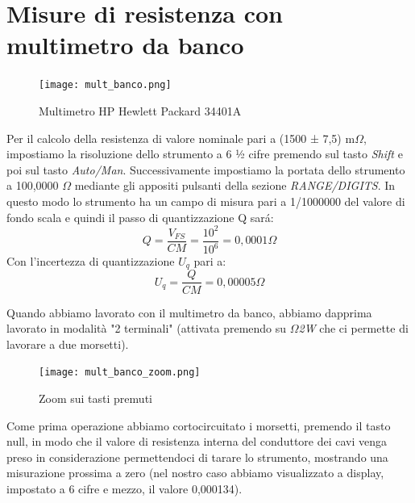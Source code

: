 \section{Misure di resistenza con multimetro da banco}
\label{sec:mult}


\begin{figure}[h]
    \centering
    \texttt{[image: mult\_banco.png]}
    \caption{Multimetro HP Hewlett Packard 34401A}
    \label{fig:mult_banco}
\end{figure}
\FloatBarrier

Per il calcolo della resistenza di valore nominale pari a (1500 ± 7,5) m$\Omega$, impostiamo la risoluzione dello strumento a 6 ½ cifre premendo sul tasto \emph{Shift} e poi sul tasto \emph{Auto/Man}. Successivamente impostiamo la portata dello strumento a 100,0000 $\Omega$ mediante gli appositi pulsanti della sezione \emph{RANGE/DIGITS}. In questo modo lo strumento ha un campo di misura 
pari a 1/1000000 del valore di fondo scala e quindi il passo di quantizzazione Q sar\'a: 
\begin{equation}
    Q = \frac{V_{FS}}{CM} = \frac{10^2}{10^6} = 0,0001 \Omega
\end{equation}
Con l'incertezza di quantizzazione $U_q$ pari a:
\begin{equation}
    U_q = \frac{Q}{CM} = 0,00005 \Omega
\end{equation}

Quando abbiamo lavorato con il multimetro da banco, abbiamo dapprima lavorato in modalità "2 terminali" (attivata premendo su  \emph{$\Omega$2W} che ci permette di lavorare a due morsetti).

\begin{figure}[h]
    \centering
    \texttt{[image: mult\_banco\_zoom.png]}
    \caption{Zoom sui tasti premuti}
    \label{fig:mult_banco_zoom}
\end{figure}
\FloatBarrier

Come prima operazione abbiamo cortocircuitato i morsetti, premendo il tasto null, in modo che il valore di resistenza interna del conduttore dei cavi venga preso in considerazione permettendoci di tarare lo strumento, mostrando una misurazione prossima a zero (nel nostro caso abbiamo visualizzato a display, impostato a 6 cifre e mezzo, il valore 0,000134).



